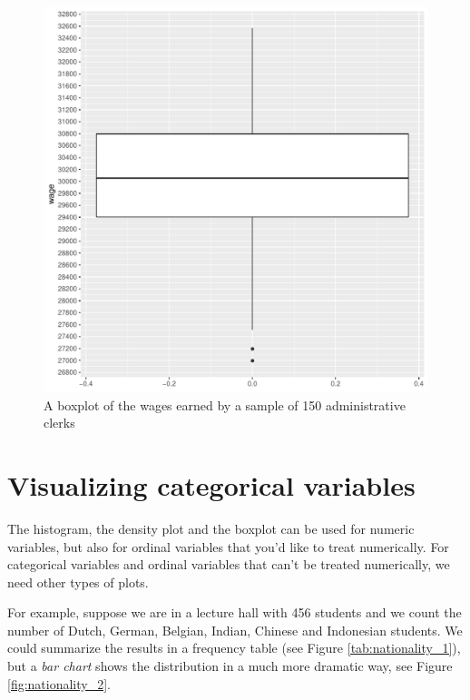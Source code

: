\documentclass[]{book}\usepackage[]{graphicx}\usepackage[]{color}
\makeatletter
\def\maxwidth{ %
  \ifdim\Gin@nat@width>\linewidth
    \linewidth
  \else
    \Gin@nat@width
  \fi
}
\newenvironment{knitrout}{}{} %
\makeatother
\begin{document}
\begin{knitrout}
\color{fgcolor}\begin{figure}

{\centering \includegraphics[width=\maxwidth]{figure/chis_7-1} 

}

\caption[A boxplot of the wages earned by a sample of 150 administrative clerks]{A boxplot of the wages earned by a sample of 150 administrative clerks}\label{fig:chis_7}
\end{figure}


\end{knitrout}




\section{Visualizing categorical variables}

The histogram, the density plot and the boxplot can be used for numeric variables, but also for ordinal variables that you'd like to treat numerically. For categorical variables and ordinal variables that can't be treated numerically, we need other types of plots.

For example, suppose we are in a lecture hall with 456 students and we count the number of Dutch, German, Belgian, Indian, Chinese and Indonesian students. We could summarize the results in a frequency table (see Figure \ref{tab:nationality_1}), but a \textit{bar chart} shows the distribution in a much more dramatic way, see Figure \ref{fig:nationality_2}.
\end{document}
